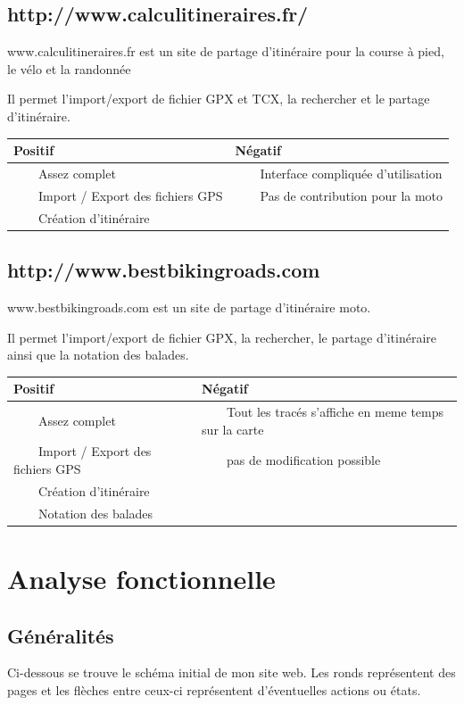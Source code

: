 \documentclass[a4paper]{article}
\newcommand{\tabitem}{~~\llap{\textbullet}~~}
\begin{document}
\subsection{http://www.calculitineraires.fr/}

www.calculitineraires.fr est un site de partage d'itinéraire pour la course à pied, le vélo et la randonnée

Il permet l'import/export de fichier GPX et TCX, la rechercher et le partage d'itinéraire.

\begin{tabular}{|l|l|}
\hline
   Positif & Négatif \\
   \hline
   \hline
   \tabitem Assez complet & \tabitem Interface compliquée d'utilisation\\
   \tabitem Import / Export des fichiers GPS &\tabitem Pas de contribution pour la moto\\
   \tabitem Création d'itinéraire & \\
   \hline
 \end{tabular}


\subsection{http://www.bestbikingroads.com}
www.bestbikingroads.com est un site de partage d'itinéraire moto.


Il permet l'import/export de fichier GPX, la rechercher, le partage d'itinéraire ainsi que la notation des balades.

\begin{tabular}{|l|l|}
\hline
   Positif & Négatif \\
   \hline
   \hline
   \tabitem Assez complet & \tabitem Tout les tracés s'affiche en meme temps sur la carte\\
   \tabitem Import / Export des fichiers GPS & \tabitem pas de modification possible\\
   \tabitem Création d'itinéraire & \\
   \tabitem Notation des balades & \\
   \hline
 \end{tabular}



\pagebreak

\section{Analyse fonctionnelle}

\subsection{Généralités}
Ci-dessous se trouve le schéma initial de mon site web. Les ronds représentent des pages et les flèches entre ceux-ci représentent d'éventuelles actions ou états.
\end{document}
